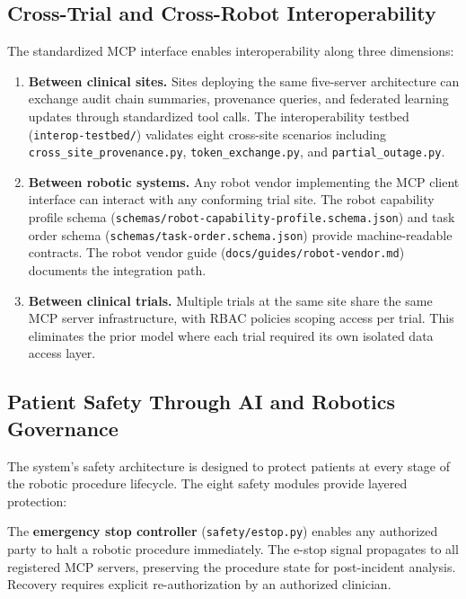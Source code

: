 \subsection{Cross-Trial and Cross-Robot Interoperability}

The standardized MCP interface enables interoperability along three dimensions:

\begin{enumerate}[leftmargin=*]
\item \textbf{Between clinical sites.} Sites deploying the same five-server architecture can exchange audit chain summaries, provenance queries, and federated learning updates through standardized tool calls. The interoperability testbed (\texttt{interop-testbed/}) validates eight cross-site scenarios including \texttt{cross\_site\_provenance.py}, \texttt{token\_exchange.py}, and \texttt{partial\_outage.py}.

\item \textbf{Between robotic systems.} Any robot vendor implementing the MCP client interface can interact with any conforming trial site. The robot capability profile schema (\texttt{schemas/robot-capability-profile.schema.json}) and task order schema (\texttt{schemas/task-order.schema.json}) provide machine-readable contracts. The robot vendor guide (\texttt{docs/guides/robot-vendor.md}) documents the integration path.

\item \textbf{Between clinical trials.} Multiple trials at the same site share the same MCP server infrastructure, with RBAC policies scoping access per trial. This eliminates the prior model where each trial required its own isolated data access layer.
\end{enumerate}

\subsection{Patient Safety Through AI and Robotics Governance}

The system's safety architecture is designed to protect patients at every stage of the robotic procedure lifecycle. The eight safety modules provide layered protection:

The \textbf{emergency stop controller} (\texttt{safety/estop.py}) enables any authorized party to halt a robotic procedure immediately. The e-stop signal propagates to all registered MCP servers, preserving the procedure state for post-incident analysis. Recovery requires explicit re-authorization by an authorized clinician.

